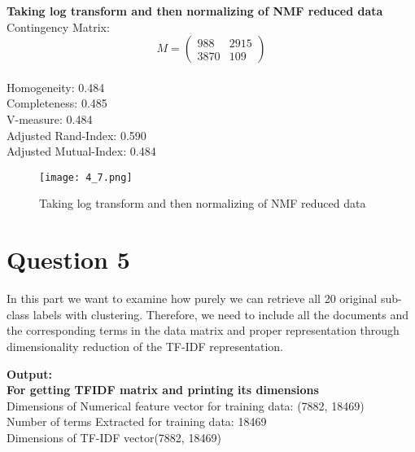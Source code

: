 \documentclass{article}
\begin{document}
\textbf{Taking log transform and then normalizing of NMF reduced data}\\
Contingency Matrix:$$ M = \left( \begin{smallmatrix} 988&2915\\ 3870&109 \end{smallmatrix} \right) $$ \\
Homogeneity: 0.484\\
Completeness: 0.485\\
V-measure: 0.484\\
Adjusted Rand-Index: 0.590\\
Adjusted Mutual-Index: 0.484\\
\begin{figure}[h]
	\centering
	\texttt{[image: 4\_7.png]}
	\caption{Taking log transform and then normalizing of NMF reduced data}
\end{figure}
\section{Question 5}
In this part we want to examine how purely we can retrieve all 20 original sub-class labels with clustering. Therefore, we need to include all the documents and the corresponding terms in the data matrix and proper representation through dimensionality reduction of the TF-IDF representation.

\textbf{Output:\\ For getting TFIDF matrix and printing its dimensions}\\
Dimensions of Numerical feature vector for training data: (7882, 18469)\\
Number of terms Extracted for training data: 18469\\
Dimensions of TF-IDF vector(7882, 18469)\\
\vspace{5cm}
\end{document}
